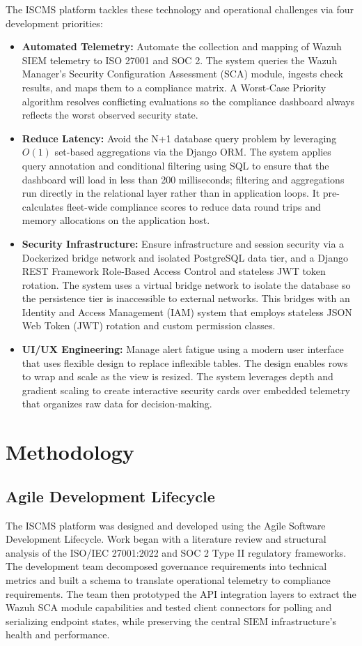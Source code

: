 The ISCMS platform tackles these technology and operational challenges via four development priorities:

\begin{itemize}
    \item \textbf{Automated Telemetry:} Automate the collection and mapping of Wazuh SIEM telemetry to ISO 27001 and SOC 2. The system queries the Wazuh Manager's Security Configuration Assessment (SCA) module, ingests check results, and maps them to a compliance matrix. A Worst-Case Priority algorithm resolves conflicting evaluations so the compliance dashboard always reflects the worst observed security state.
    \item \textbf{Reduce Latency:} Avoid the N+1 database query problem by leveraging $O(1)$ set-based aggregations via the Django ORM. The system applies query annotation and conditional filtering using SQL to ensure that the dashboard will load in less than 200 milliseconds; filtering and aggregations run directly in the relational layer rather than in application loops. It pre-calculates fleet-wide compliance scores to reduce data round trips and memory allocations on the application host.
    \item \textbf{Security Infrastructure:} Ensure infrastructure and session security via a Dockerized bridge network and isolated PostgreSQL data tier, and a Django REST Framework Role-Based Access Control and stateless JWT token rotation. The system uses a virtual bridge network to isolate the database so the persistence tier is inaccessible to external networks. This bridges with an Identity and Access Management (IAM) system that employs stateless JSON Web Token (JWT) rotation and custom permission classes.
    \item \textbf{UI/UX Engineering:} Manage alert fatigue using a modern user interface that uses flexible design to replace inflexible tables. The design enables rows to wrap and scale as the view is resized. The system leverages depth and gradient scaling to create interactive security cards over embedded telemetry that organizes raw data for decision-making.
\end{itemize}

\section{Methodology}

\subsection{Agile Development Lifecycle}
The ISCMS platform was designed and developed using the Agile Software Development Lifecycle. Work began with a literature review and structural analysis of the ISO/IEC 27001:2022 and SOC 2 Type II regulatory frameworks. The development team decomposed governance requirements into technical metrics and built a schema to translate operational telemetry to compliance requirements. The team then prototyped the API integration layers to extract the Wazuh SCA module capabilities and tested client connectors for polling and serializing endpoint states, while preserving the central SIEM infrastructure's health and performance.

